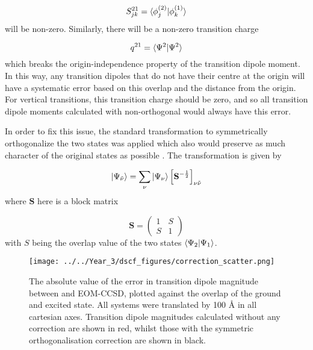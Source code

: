 \begin{equation}
S^{21}_{jk} = \braket{\phi_j^{\left(2\right)} | \phi_k^{\left(1\right)}}
\end{equation}
%
will be non-zero. Similarly, there will be a non-zero transition charge

\begin{equation}
q^{21} = \braket{\Psi^2|\Psi^2}
\end{equation}
%
which breaks the origin-independence property of the transition dipole moment. In
this way, any transition dipoles that do not have their centre at the origin will
have a systematic error based on this overlap and the distance from the origin.
For vertical transitions, this transition charge should be zero, and so all transition
dipole moments calculated with non-orthogonal \dscf would always have this error.

In order to fix this issue, the standard transformation to symmetrically orthogonalize 
the two states was applied which also would preserve as much character of the original
states as possible \cite{Lowdin1950}. The transformation is given by

\begin{equation}
\ket{\Psi_{\tilde{\nu}}} = \sum_{\nu} \ket{\Psi_\nu} \left[\mathbf{S}^{-\frac{1}{2}} \right]_{\nu\tilde{\nu}}
\end{equation}
%
where $\mathbf{S}$ here is a block matrix

\begin{equation}
\mathbf{S} = \begin{pmatrix}
    1 & S \\
    S & 1 
\end{pmatrix}
\end{equation}
%
with $S$ being the overlap value of the two states $\braket{\Psi_2|\Psi_1}$.

\begin{figure}
\centering
\texttt{[image: ../../Year\_3/dscf\_figures/correction\_scatter.png]}
\caption{The absolute value of the error in transition dipole magnitude between
\dscf and EOM-CCSD, plotted against the \dscf overlap of the ground and excited
state. All systems were translated by 100 \AA{} in all cartesian axes. Transition
dipole magnitudes calculated without any correction are shown in red, whilst
those with the symmetric orthogonalisation correction are shown in black.}
\label{fig:correction_scatter}
\end{figure}

